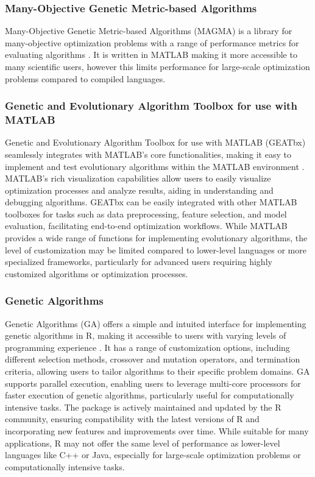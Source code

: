 \documentclass[12pt]{report}
\begin{document}
\subsubsection{Many-Objective Genetic Metric-based Algorithms}
Many-Objective Genetic Metric-based Algorithms (MAGMA) is a library for many-objective optimization problems with a range of performance metrics for evaluating algorithms \cite{Wang2023}. It is written in MATLAB making it more accessible to many scientific users, however this limits performance for large-scale optimization problems compared to compiled languages.

\subsubsection{Genetic and Evolutionary Algorithm Toolbox for use with MATLAB}
Genetic and Evolutionary Algorithm Toolbox for use with MATLAB (GEATbx) seamlessly integrates with MATLAB's core functionalities, making it easy to implement and test evolutionary algorithms within the MATLAB environment \cite{pohlheim1994geatbx}. MATLAB's rich visualization capabilities allow users to easily visualize optimization processes and analyze results, aiding in understanding and debugging algorithms. GEATbx can be easily integrated with other MATLAB toolboxes for tasks such as data preprocessing, feature selection, and model evaluation, facilitating end-to-end optimization workflows. While MATLAB provides a wide range of functions for implementing evolutionary algorithms, the level of customization may be limited compared to lower-level languages or more specialized frameworks, particularly for advanced users requiring highly customized algorithms or optimization processes.
 
 
\subsubsection{Genetic Algorithms}
Genetic Algorithms (GA) offers a simple and intuited interface for implementing genetic algorithms in R, making it accessible to users with varying levels of programming experience \cite{GA1, GA2}. It has a range of customization options, including different selection methods, crossover and mutation operators, and termination criteria, allowing users to tailor algorithms to their specific problem domains. GA supports parallel execution, enabling users to leverage multi-core processors for faster execution of genetic algorithms, particularly useful for computationally intensive tasks. The package is actively maintained and updated by the R community, ensuring compatibility with the latest versions of R and incorporating new features and improvements over time. While suitable for many applications, R may not offer the same level of performance as lower-level languages like C++ or Java, especially for large-scale optimization problems or computationally intensive tasks.
\end{document}
